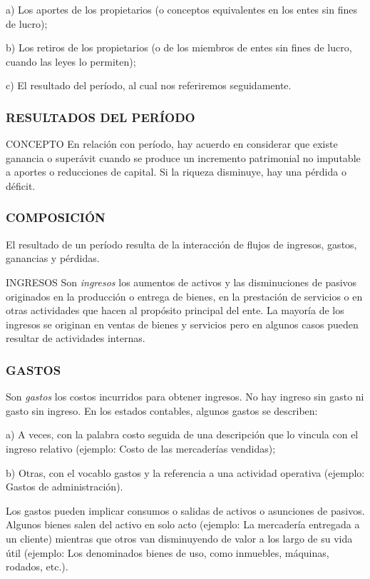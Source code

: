 a) Los aportes de los propietarios (o conceptos equivalentes en los entes sin fines de lucro);

b) Los retiros de los propietarios (o de los miembros de entes sin fines de lucro, cuando las leyes lo permiten);

c) El resultado del período, al cual nos referiremos seguidamente.

\subsubsection*{RESULTADOS DEL PERÍODO}
CONCEPTO En relación con período, hay acuerdo en considerar que existe ganancia o superávit cuando se produce un incremento patrimonial no imputable a aportes o reducciones de capital. Si la riqueza disminuye, hay una pérdida o déficit.

\subsubsection*{COMPOSICIÓN}
El resultado de un período resulta de la interacción de flujos de ingresos, gastos, ganancias y pérdidas.

INGRESOS Son \textit{ingresos }los aumentos de activos y las disminuciones de pasivos originados en la producción o entrega de bienes, en la prestación de servicios o en otras actividades que hacen al propósito principal del ente. La mayoría de los ingresos se originan en ventas de bienes y servicios pero en algunos casos pueden resultar de actividades internas.

\subsubsection*{GASTOS}
Son \textit{gastos }los costos incurridos para obtener ingresos. No hay ingreso sin gasto ni gasto sin ingreso. En los estados contables, algunos gastos se describen:

a) A veces, con la palabra costo seguida de una descripción que lo vincula con el ingreso relativo (ejemplo: Costo de las mercaderías vendidas);

b) Otras, con el vocablo gastos y la referencia a una actividad operativa (ejemplo: Gastos de administración).

Los gastos pueden implicar consumos o salidas de activos o asunciones de pasivos. Algunos bienes salen del activo en solo acto (ejemplo: La mercadería entregada a un cliente) mientras que otros van disminuyendo de valor a los largo de su vida útil (ejemplo: Los denominados bienes de uso, como inmuebles, máquinas, rodados, etc.).

